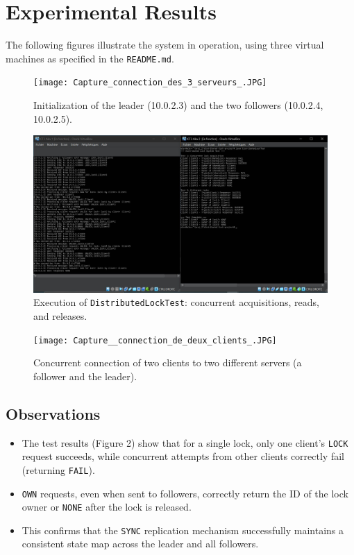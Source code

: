 \documentclass[a4paper,11pt]{article}
\begin{document}
\section{Experimental Results}
The following figures illustrate the system in operation, using three virtual machines as specified in the \texttt{README.md}.

\begin{figure}[H]
\centering
\texttt{[image: Capture\_connection\_des\_3\_serveurs\_.JPG]}
\caption{Initialization of the leader (10.0.2.3) and the two followers (10.0.2.4, 10.0.2.5).}
\end{figure}

\begin{figure}[H]
\centering
\includegraphics[width=0.9\linewidth]{Capture_distributed_lock_test.JPG}
\caption{Execution of \texttt{DistributedLockTest}: concurrent acquisitions, reads, and releases.}
\end{figure}

\begin{figure}[H]
\centering
\texttt{[image: Capture\_\_connection\_de\_deux\_clients\_.JPG]}
\caption{Concurrent connection of two clients to two different servers (a follower and the leader).}
\end{figure}

\subsection*{Observations}
\begin{itemize}
    \item The test results (Figure 2) show that for a single lock, only one client's \texttt{LOCK} request succeeds, while concurrent attempts from other clients correctly fail (returning \texttt{FAIL}).
    \item \texttt{OWN} requests, even when sent to followers, correctly return the ID of the lock owner or \texttt{NONE} after the lock is released.
    \item This confirms that the \texttt{SYNC} replication mechanism successfully maintains a consistent state map across the leader and all followers.
\end{itemize}
\end{document}
